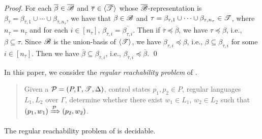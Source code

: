 \begin{proof}
	For each $\overline{\beta} \in \overline{{\mathscr{B} }}$ and $\overline{\tau} \in \langle \overline{{\mathscr{T} }} \rangle$ whose $\overline{{\mathscr{B} }}$-representation is $\beta_{\overline{\tau}}=\beta_{\overline{\tau}, 1} \cup \cdots \cup \beta_{\overline{\tau}, n_{\overline{\tau}}}$, we have that $\beta\in{\mathscr{B} }$ and $\tau = \beta_{\tau,1}\cup \cdots \cup \beta_{\tau,n_\tau} \in {\mathscr{T} }$, where $n_\tau = n_{\overline{\tau}}$ and for each $i\in[n_\tau]$, $\beta_{\overline{\tau}, i} = \overline{\beta_{\tau, i}}$.
	Then if $\overline{\tau}\preceq\overline{\beta}$, we have $\tau \preceq \beta$, i.e., $\beta\subseteq \tau$. Since ${\mathscr{B} }$ is the union-basis of $\langle {\mathscr{T} } \rangle$, we have $\beta_{\tau, i}\preceq \beta$, i.e., $\beta\subseteq\beta_{\tau, i}$ for some $i\in[n_\tau]$. Then we have $\overline{\beta}\subseteq \beta_{\overline{\tau}, i}$, i.e., $\beta_{\overline{\tau}, i} \preceq \overline{\beta}$.
	\qed

\end{proof}

In this paper, we consider the \emph{regular reachability problem} of {\WOTrPDS}.
\begin{quote} 
	Given a {\WOTrPDS} ${\mathcal{P} } = (P, \Gamma, {\mathscr{T} }, \Delta)$, control states $p_1, p_2 \in P$, regular languages $L_1, L_2$ over $\Gamma$, determine whether there exist %
	$w_1 \in L_1$, $w_2 \in L_2$ such that $(p_1, w_1) \xRightarrow{{\mathcal{P} }} (p_2, w_2)$.
\end{quote}
%



\begin{theorem}\label{thm-wstrpds-reach}
The regular reachability problem of {\WOTrPDS} is decidable.
\end{theorem}

